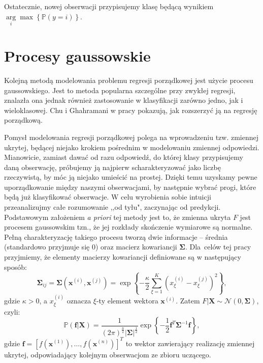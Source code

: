 \documentclass{mini}
\newcommand{\argmax}{\arg\!\max}
\begin{document}
Ostatecznie, nowej obserwacji przypisujemy klasę będącą wynikiem $\underset{i}\argmax \left\lbrace\mathbb{P}(y=i)\right\rbrace$.

\section{Procesy gaussowskie}

Kolejną metodą modelowania problemu regresji porządkowej jest użycie procesu gaussowskiego. Jest to metoda popularna szczególne przy zwykłej regresji, znalazła ona jednak również zastosowanie w klasyfikacji zarówno jedno, jak i wieloklasowej. Chu i Ghahramani w pracy \cite{reg} pokazują, jak rozszerzyć ją na regresję porządkową. 

Pomysł modelowania regresji porządkowej polega na wprowadzeniu tzw. zmiennej ukrytej, będącej niejako krokiem pośrednim w modelowaniu zmiennej odpowiedzi. Mianowicie, zamiast dawać od razu odpowiedź, do której klasy przypisujemy daną obserwację, próbujemy ją najpierw scharakteryzować jako liczbę rzeczywistą, by móc ją niejako umieścić na prostej. Dzięki temu uzyskamy pewne uporządkowanie między naszymi obserwacjami, by następnie wybrać progi, które będą już klasyfikować obserwacje. W celu wyrobienia sobie intuicji przeanalizujmy całe rozumowanie ,,od tyłu", zaczynając od predykcji. Podstawowym założeniem \textit{a priori} tej metody jest to, że zmienna ukryta $F$ jest procesem gaussowskim tzn., że jej rozkłady skończenie wymiarowe są normalne. Pełną charakteryzację takiego procesu tworzą dwie informacje -- średnia (standardowo przyjmuje się $0$) oraz macierz kowariancji $\mathbf{\Sigma}$. Dla~celów tej pracy przyjmiemy, że elementy macierzy kowariancji definiowane są w następujący sposób:
$$
\mathbf{\Sigma}_{ij} = \mathbf{\Sigma}(\textbf{x}^{(i)}, \textbf{x}^{(j)}) = \exp \left\lbrace -\frac{\kappa}{2}\sum_{\xi=1}^K (x^{(i)}_{\xi} - x^{(j)}_{\xi})^2\right\rbrace,
$$
gdzie $\kappa>0$, a $x^{(i)}_{\xi}$ oznacza $\xi$-ty element wektora $\mathbf{x}^{(i)}$. Zatem $F | \mathbf{X} \sim \mathcal{N}(0, \mathbf{\Sigma})$, czyli:
\begin{equation}\label{apriori}
\mathbb{P}(\mathbf{f} | \mathbf{X}) = \frac{1}{(2\pi)^{\frac{n}{2}}|\mathbf{\Sigma}|^{\frac{1}{2}}}\exp\left\lbrace -\frac{1}{2}\mathbf{f}^T\mathbf{\Sigma}^{-1}\mathbf{f} \right\rbrace,
\end{equation}
gdzie $\mathbf{f} = [f(\mathbf{x}^{(1)}), \ldots, f(\mathbf{x}^{(n)})]^T$ to wektor zawierający realizację zmiennej ukrytej, odpowiadający kolejnym obserwacjom ze zbioru uczącego.
\end{document}
